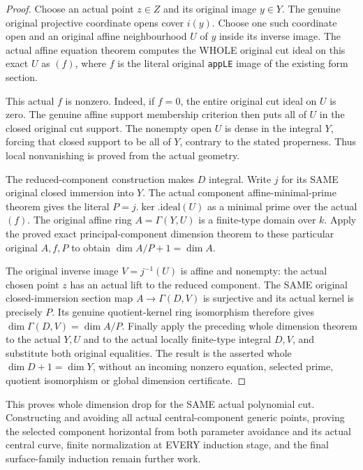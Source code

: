 \begin{proof}
Choose an actual point $z\in Z$ and its original image $y\in Y$.
The genuine original projective coordinate opens cover $i(y)$.
Choose one such coordinate open and an original affine neighbourhood
$U$ of $y$ inside its inverse image. The actual affine equation
theorem computes the WHOLE original cut ideal on this exact $U$ as
$(f)$, where $f$ is the literal original \texttt{appLE} image of the
existing form section.

This actual $f$ is nonzero. Indeed, if $f=0$, the entire original cut
ideal on $U$ is zero. The genuine affine support membership criterion
then puts all of $U$ in the closed original cut support. The nonempty
open $U$ is dense in the integral $Y$, forcing that closed support to
be all of $Y$, contrary to the stated properness. Thus local
nonvanishing is proved from the actual geometry.

The reduced-component construction makes $D$ integral. Write $j$ for
its SAME original closed immersion into $Y$. The actual component
affine-minimal-prime theorem gives the literal
$P=j.\ker.\mathrm{ideal}(U)$ as a minimal prime over the actual
$(f)$. The original affine ring $A=\Gamma(Y,U)$ is a finite-type
domain over $k$. Apply the proved exact principal-component dimension
theorem to these particular original $A,f,P$ to obtain
$\dim A/P+1=\dim A$.

The original inverse image $V=j^{-1}(U)$ is affine and nonempty:
the actual chosen point $z$ has an actual lift to the reduced
component. The SAME original closed-immersion section map
$A\to\Gamma(D,V)$ is surjective and its actual kernel is precisely
$P$. Its genuine quotient-kernel ring isomorphism therefore gives
$\dim\Gamma(D,V)=\dim A/P$. Finally apply the preceding whole
dimension theorem to the actual $Y,U$ and to the actual locally
finite-type integral $D,V$, and substitute both original equalities.
The result is the asserted whole $\dim D+1=\dim Y$, without an
incoming nonzero equation, selected prime, quotient isomorphism or
global dimension certificate.
\end{proof}

This proves whole dimension drop for the SAME actual polynomial cut.
Constructing and avoiding all actual central-component generic points,
proving the selected component horizontal from both parameter avoidance
and its actual central curve, finite normalization at EVERY induction
stage, and the final surface-family induction remain further work.
